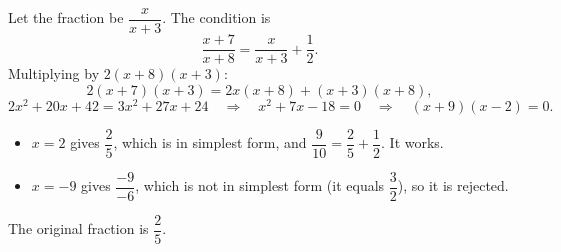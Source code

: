 Let the fraction be $\dfrac {x}{x+3}$. The condition is
\[
\dfrac{x+7}{x+8}=\dfrac{x}{x+3}+\dfrac{1}{2} .
\]
Multiplying by $2(x+8)(x+3)$:
\[
2(x+7)(x+3)=2x(x+8)+(x+3)(x+8),
\]
\[
2x^2+20x+42=3x^2+27x+24\quad\Longrightarrow\quad x^2+7x-18=0\quad\Longrightarrow\quad(x+9)(x-2)=0 .
\]
\begin{itemize}
\item $x=2$ gives $\dfrac{2}{5}$, which is in simplest form, and $\dfrac{9}{10}=\dfrac{2}{5}+\dfrac{1}{2}$. It works.
\item $x=-9$ gives $\dfrac{-9}{-6}$, which is not in simplest form (it equals $\dfrac{3}{2}$), so it is rejected.
\end{itemize}
The original fraction is $\boxed{\dfrac{2}{5}}$.

